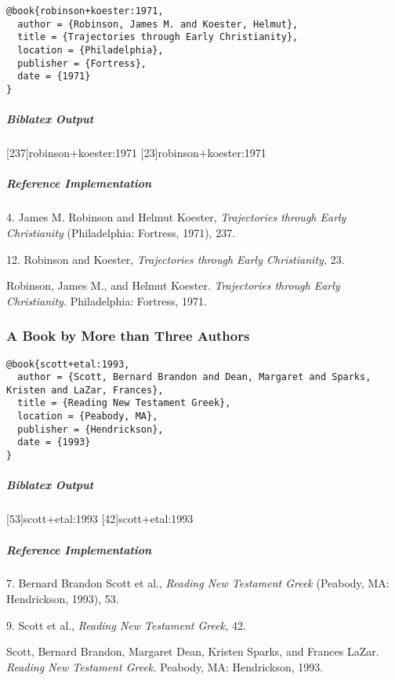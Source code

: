 \documentclass[a4paper]{article}
\newenvironment{biboutput}{%
  \subparagraph{Biblatex Output}
}{\color{black}}
\newenvironment{refimp}{%
  \subparagraph{Reference Implementation}
  \color{reference-colour}
  \rm
}{\par\color{black}}
\begin{document}
\begin{lstlisting}
@book{robinson+koester:1971,
  author = {Robinson, James M. and Koester, Helmut},
  title = {Trajectories through Early Christianity},
  location = {Philadelphia},
  publisher = {Fortress},
  date = {1971}
}
\end{lstlisting}  

\begin{biboutput}
  [237]{robinson+koester:1971}
  [23]{robinson+koester:1971}
\end{biboutput}

\begin{refimp}
  \hspace*{\bibindent}4. James M. Robinson and Helmut Koester,
  \emph{Trajectories through Early Christianity} (Philadelphia: Fortress,
  1971), 237.

  \hspace*{\bibindent}12. Robinson and Koester, \emph{Trajectories through
  Early Christianity,} 23.

  \hangindent\bibindent Robinson, James M., and Helmut Koester. \emph{Trajectories
  through Early Christianity.} Philadelphia: Fortress, 1971.
\end{refimp}

\subsubsection{A Book by More than Three Authors}

\begin{lstlisting}
@book{scott+etal:1993,
  author = {Scott, Bernard Brandon and Dean, Margaret and Sparks, Kristen and LaZar, Frances},
  title = {Reading New Testament Greek},
  location = {Peabody, MA},
  publisher = {Hendrickson},
  date = {1993}
}
\end{lstlisting}  

\begin{biboutput}
  [53]{scott+etal:1993}
  [42]{scott+etal:1993}
\end{biboutput}

\begin{refimp}
  \hspace*{\bibindent}7. Bernard Brandon Scott et al., \emph{Reading New
  Testament Greek} (Peabody, MA: Hendrickson, 1993), 53.
  
  \hspace*{\bibindent}9. Scott et al., \emph{Reading New Testament Greek,} 42.

  \hangindent\bibindent Scott, Bernard Brandon, Margaret Dean, Kristen Sparks,
  and Frances LaZar. \emph{Reading New Testament Greek.} Peabody, MA:
  Hendrickson, 1993.
\end{refimp}
\end{document}
